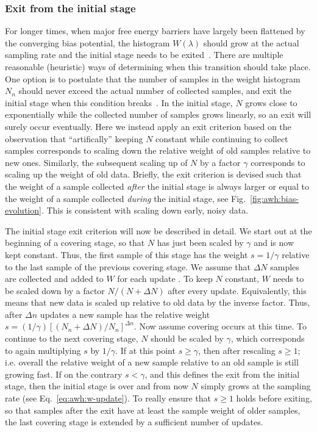 \subsubsection{Exit from the initial stage}
For longer times, when major free energy barriers have  largely been flattened by the converging bias potential,
the histogram $W(\lambda)$ should grow at the actual sampling rate and the initial stage needs to be exited~\cite{belardinelli2007fast}.
There are multiple reasonable (heuristic) ways of determining when this transition should take place.
One option is to postulate that the number of samples in the weight histogram $N_n$ should never exceed the actual number of collected samples,
and exit the initial stage when this condition breaks~\cite{lindahl2014accelerated}.
In the initial stage, $N$ grows close to exponentially while the collected number of samples grows linearly, so an exit will surely occur eventually.
Here we instead apply an exit criterion based on the observation that ``artifically''  keeping $N$ constant while 
continuing to collect samples 
corresponds to scaling down the  relative weight of old samples relative to new ones.
Similarly, the subsequent scaling up of $N$ by a factor $\gamma$ corresponds to scaling up the weight of old data.
Briefly, the exit criterion is devised such that the weight of a sample collected \emph{after} the initial stage is always larger or equal to
the weight of a sample collected \emph{during} the initial stage, see Fig.~\ref{fig:awh:bias-evolution}. This is consistent with scaling down early, noisy data.

The initial stage exit criterion will now be described in detail. 
We start out at the beginning of a covering stage,
so that $N$ has just been scaled by $\gamma$ and is now kept constant.
Thus, the first sample of this stage has the  weight $s= 1/\gamma$ relative to the last  sample 
of the previous covering stage.
We assume that $\Delta N$ samples are collected and added to $W$ for each update .
To keep $N$ constant, $W$ needs to be scaled down by a factor $N/(N + \Delta N)$ after every update.
Equivalently, this means that  new data is scaled up relative to old data by the inverse factor.
Thus, after $\Delta n$ updates a new sample has the relative weight  $s=(1/\gamma) [(N_n + \Delta N)/N_n]^{\Delta n}$. 
Now assume covering occurs at this time. 
To continue to the next covering stage,
$N$ should be scaled by $\gamma$,  which corresponds to again multiplying $s$ by   $1/\gamma$.
If at this point $s \ge \gamma$, then after rescaling $s \ge 1$;
i.e. overall the relative weight of a new sample relative to an old sample is still growing fast.
If  on the contrary $s < \gamma$,  and this defines the exit from the initial stage,
then  the initial stage is over and from now $N$ simply grows at the sampling rate (see Eq.~\ref{eq:awh:w-update}).
To really ensure that $s\ge 1$ holds before exiting, so that samples after the exit have at least the sample weight of older samples,
the last covering stage is extended by a sufficient number of updates.

